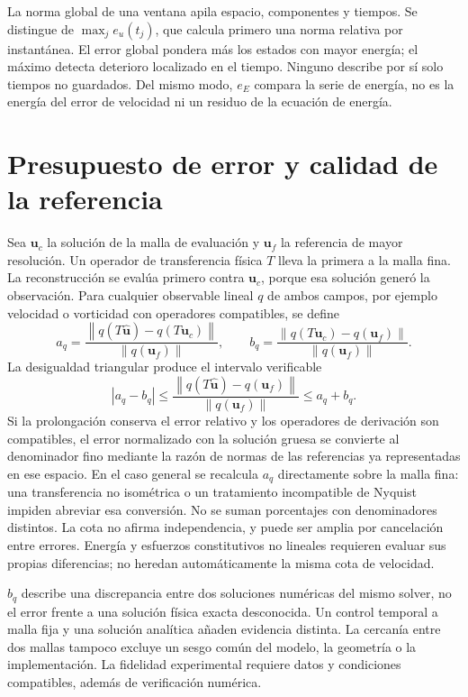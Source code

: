 \documentclass[11pt,oneside,openany]{book}
\newcommand{\norm}[1]{\left\lVert #1\right\rVert}
\newcommand{\uhat}{\widehat{\boldsymbol u}}
\begin{document}
La norma global de una ventana apila espacio, componentes y tiempos. Se
distingue de $\max_j e_u(t_j)$, que calcula primero una norma relativa por
instantánea. El error global pondera más los estados con mayor energía; el
máximo detecta deterioro localizado en el tiempo. Ninguno describe por sí
solo tiempos no guardados. Del mismo modo, $e_E$ compara la serie de energía,
no es la energía del error de velocidad ni un residuo de la ecuación de energía.

\section{Presupuesto de error y calidad de la referencia}
Sea $\boldsymbol u_c$ la solución de la malla de evaluación y
$\boldsymbol u_f$ la referencia de mayor resolución. Un operador de
transferencia física $T$ lleva la primera a la malla fina. La reconstrucción
se evalúa primero contra $\boldsymbol u_c$, porque esa solución generó la
observación. Para cualquier observable lineal $q$ de ambos campos, por ejemplo
velocidad o vorticidad con operadores compatibles, se define
\begin{equation}
 a_q=\frac{\norm{q(T\uhat)-q(T\boldsymbol u_c)}}{\norm{q(\boldsymbol u_f)}},
 \qquad b_q=\frac{\norm{q(T\boldsymbol u_c)-q(\boldsymbol u_f)}}
 {\norm{q(\boldsymbol u_f)}}.
\end{equation}
La desigualdad triangular produce el intervalo verificable
\begin{equation}
 |a_q-b_q|\leq
 \frac{\norm{q(T\uhat)-q(\boldsymbol u_f)}}{\norm{q(\boldsymbol u_f)}}
 \leq a_q+b_q.
 \label{eq:error-budget}
\end{equation}
Si la prolongación conserva el error relativo y los operadores de derivación
son compatibles, el error normalizado con la solución gruesa se convierte
al denominador fino mediante la razón de normas de las referencias ya
representadas en ese espacio. En el caso general se recalcula $a_q$
directamente sobre la malla fina: una transferencia no isométrica o un
tratamiento incompatible de Nyquist impiden abreviar esa conversión.
No se suman porcentajes con denominadores distintos. La cota no
afirma independencia, y puede ser amplia por cancelación entre errores.
Energía y esfuerzos constitutivos no lineales requieren evaluar sus propias
diferencias; no heredan automáticamente la misma cota de velocidad.

$b_q$ describe una discrepancia entre dos soluciones numéricas del mismo
solver, no el error frente a una solución física exacta desconocida. Un
control temporal a malla fija y una solución analítica añaden evidencia
distinta. La cercanía entre dos mallas tampoco excluye un sesgo común del
modelo, la geometría o la implementación. La fidelidad experimental requiere
datos y condiciones compatibles, además de verificación numérica.
\end{document}
